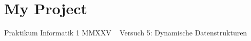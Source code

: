 \chapter{My Project}
\hypertarget{index}{}\label{index}
Praktikum Informatik 1 MMXXV ~\newline
 Versuch 5\+: Dynamische Datenstrukturen 